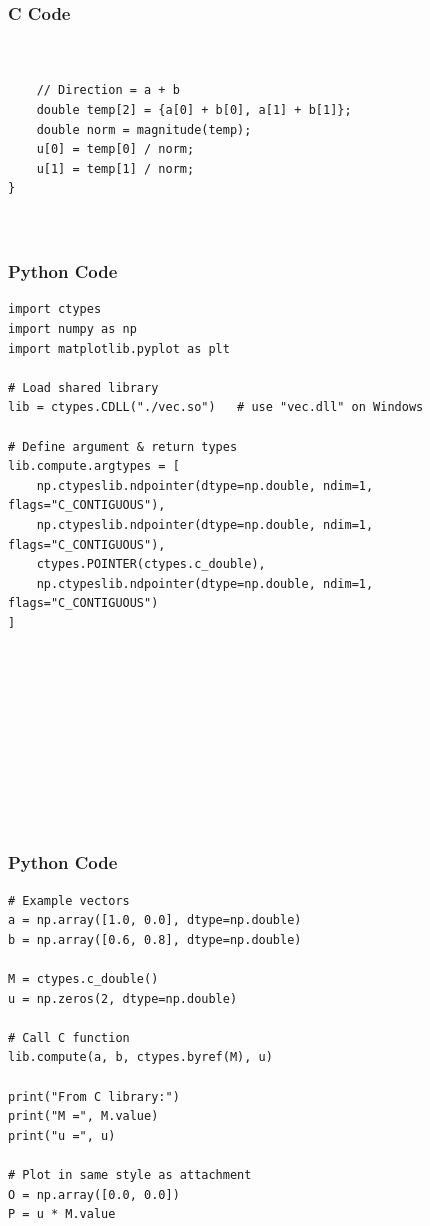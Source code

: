 \documentclass{beamer}
\begin{document}
\begin{frame}[fragile]
    \frametitle{C Code  }

    \begin{lstlisting}


    // Direction = a + b
    double temp[2] = {a[0] + b[0], a[1] + b[1]};
    double norm = magnitude(temp);
    u[0] = temp[0] / norm;
    u[1] = temp[1] / norm;
}



    \end{lstlisting}
\end{frame}


\begin{frame}[fragile]
    \frametitle{Python Code}
    \begin{lstlisting}
import ctypes
import numpy as np
import matplotlib.pyplot as plt

# Load shared library
lib = ctypes.CDLL("./vec.so")   # use "vec.dll" on Windows

# Define argument & return types
lib.compute.argtypes = [
    np.ctypeslib.ndpointer(dtype=np.double, ndim=1, flags="C_CONTIGUOUS"),
    np.ctypeslib.ndpointer(dtype=np.double, ndim=1, flags="C_CONTIGUOUS"),
    ctypes.POINTER(ctypes.c_double),
    np.ctypeslib.ndpointer(dtype=np.double, ndim=1, flags="C_CONTIGUOUS")
]











    \end{lstlisting}
\end{frame}

\begin{frame}[fragile]
    \frametitle{Python Code}
    \begin{lstlisting}
# Example vectors
a = np.array([1.0, 0.0], dtype=np.double)
b = np.array([0.6, 0.8], dtype=np.double)

M = ctypes.c_double()
u = np.zeros(2, dtype=np.double)

# Call C function
lib.compute(a, b, ctypes.byref(M), u)

print("From C library:")
print("M =", M.value)
print("u =", u)

# Plot in same style as attachment
O = np.array([0.0, 0.0])
P = u * M.value












    \end{lstlisting}
\end{frame}
\end{document}
